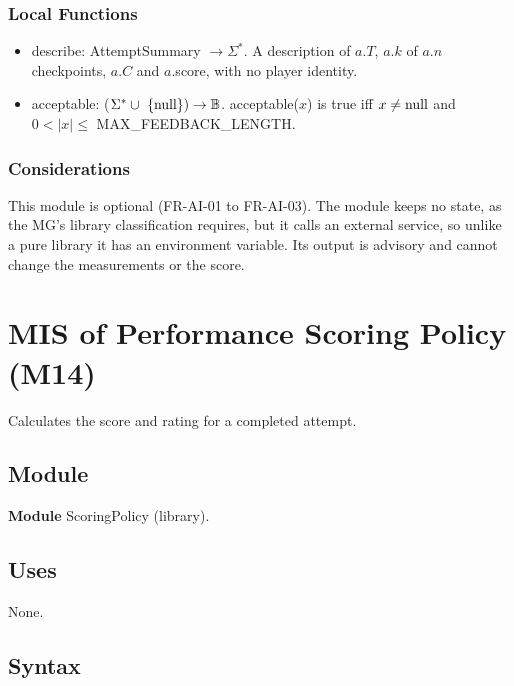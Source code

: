 \documentclass[12pt, titlepage]{article}
\newcommand{\True}{\textnormal{true}}
\newcommand{\nul}{\textnormal{null}}
\begin{document}
\subsubsection{Local Functions}

\begin{itemize}
\item describe: AttemptSummary $\rightarrow \Sigma^*$. A description of $a.T$,
  $a.k$ of $a.n$ checkpoints, $a.C$ and $a$.score, with no player identity.
\item acceptable: ($\Sigma^* \cup \ \{\nul\}) \rightarrow \mathbb{B}$.
  acceptable($x$) is \True{} iff $x \neq \nul$ and $0 < |x| \leq$
  MAX\_FEEDBACK\_LENGTH.
\end{itemize}

\subsubsection{Considerations}

This module is optional (FR-AI-01 to FR-AI-03). The module keeps no state, as
the MG's library classification requires, but it calls an external service, so
unlike a pure library it has an environment variable. Its output is advisory
and cannot change the measurements or the score.

\newpage
\section{MIS of Performance Scoring Policy (M14)} \label{sec:M14}

Calculates the score and rating for a completed attempt.

\subsection{Module}

\textbf{Module} ScoringPolicy (library).

\subsection{Uses}

None.

\subsection{Syntax}
\end{document}
